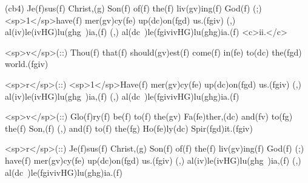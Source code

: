 (cb4) Je(f)sus(f) Christ,(g) Son(f) of(f) the(f) liv(gv)ing(f) God(f) (;) <sp>1</sp>have(f) mer(gv)cy(fe) up(dc)on(fgd) us.(fgiv) (,) al(iv)le(ivHG)lu(ghg~)ia,(f) (,) al(dc~)le(fgivivHG)lu(ghg)ia.(f) <c>ii.</c>

<sp>v</sp>(::) Thou(f) that(f) should(gv)est(f) come(f) in(fe) to(dc) the(fgd) world.(fgiv)

<sp>r</sp>(::) <sp>1</sp>Have(f) mer(gv)cy(fe) up(dc)on(fgd) us.(fgiv) (,) al(iv)le(ivHG)lu(ghg~)ia,(f) (,) al(dc~)le(fgivivHG)lu(ghg)ia.(f)

<sp>v</sp>(::) Glo(f)ry(f) be(f) to(f) the(gv) Fa(fe)ther,(dc) and(fv) to(fg) the(f) Son,(f) (,) and(f) to(f) the(fg) Ho(fe)ly(dc) Spir(fgd)it.(fgiv) 

<sp>r</sp>(::) Je(f)sus(f) Christ,(g) Son(f) of(f) the(f) liv(gv)ing(f) God(f) (;) have(f) mer(gv)cy(fe) up(dc)on(fgd) us.(fgiv) (,) al(iv)le(ivHG)lu(ghg~)ia,(f) (,) al(dc~)le(fgivivHG)lu(ghg)ia.(f)